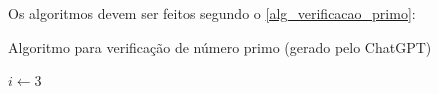 \begin{apendicesenv}
    Os  algoritmos devem ser feitos segundo o \autoref{alg_verificacao_primo}:

    \begin{algorithm}
    \caption{Algoritmo para verificação de número primo (gerado pelo ChatGPT)}
    \label{alg_verificacao_primo}

    $i \leftarrow 3$ \\
     \\
    
    \end{algorithm}


\end{apendicesenv}
